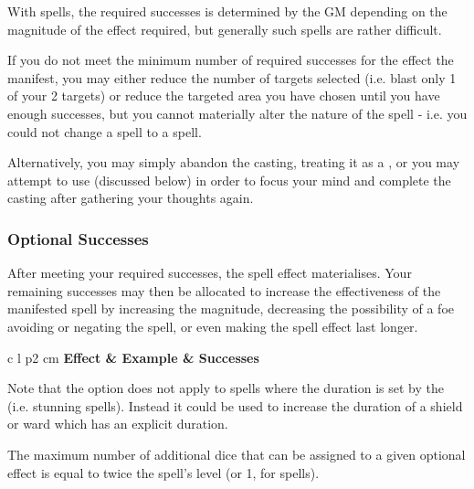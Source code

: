 With  spells, the required successes is determined by the GM depending on the magnitude of the effect required, but generally such spells are rather difficult. 

If you do not meet the minimum number of required successes for the effect the manifest, you may either reduce the number of targets selected (i.e. blast only 1 of your 2 targets) or reduce the targeted area you have chosen until you have enough successes, but you cannot materially alter the nature of the spell - i.e. you could not change a  spell to a  spell. 

Alternatively, you may simply abandon the casting, treating it as a , or you may attempt to use  (discussed below) in order to focus your mind and complete the casting after gathering your thoughts again. 

\subsubsection{Optional Successes}

After meeting your required successes, the spell effect materialises. Your remaining successes may then be allocated to increase the effectiveness of the manifested spell by increasing the magnitude, decreasing the possibility of a foe avoiding or negating the spell, or even making the spell effect last longer. 

\begin{center}
	\begin{rndtable}{c l p{2 cm}}
	\bf Effect	&	\bf Example	&	\bf Successes
	\\
	\end{rndtable}
\end{center}

Note that the  option does not apply to spells where the duration is set by the  (i.e. stunning spells). Instead it could be used to increase the duration of a shield or ward which has an explicit duration. 

The maximum number of additional dice that can be assigned to a given optional effect is equal to twice the spell's level (or 1, for \levelZero{} spells). 

